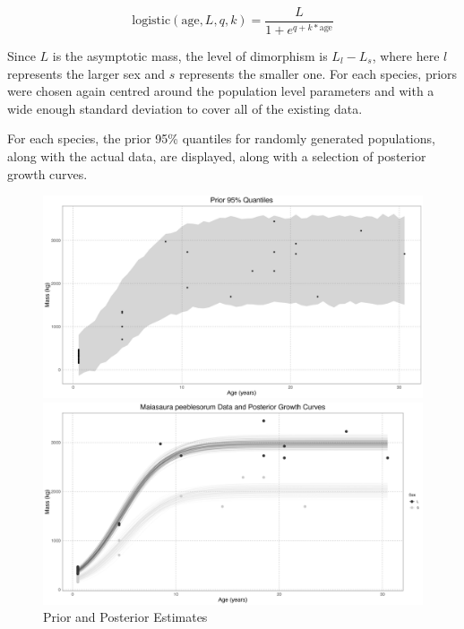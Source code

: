 \documentclass[letterpaper]{article}
\begin{document}
$$
\text{logistic}(\text{age}, L, q, k) = \frac{L}{1 + e^{q+k \ast \text{age}}}
$$

Since $L$ is the asymptotic mass, the level of dimorphism is $L_l - L_s$, where here $l$ represents the larger sex and $s$ represents the smaller one. For each species, priors were chosen again centred around the population level parameters and with a wide enough standard deviation to cover all of the existing data.

For each species, the prior 95\% quantiles for randomly generated populations, along with the actual data, are displayed, along with a selection of posterior growth curves.

\begin{figure}[H]
  \centering
  \begin{minipage}[b]{0.45\textwidth}
    \centering
    \includegraphics[width=\textwidth]{images/maiasauraPrior.png}
  \end{minipage}
  \begin{minipage}[b]{0.45\textwidth}
    \centering
    \includegraphics[width=\textwidth]{images/maiasauraPosterior.png}
  \end{minipage}
    \label{fig:maiasauraPriorPosterior}
    \caption{\maia{} Prior and Posterior Estimates}
\end{figure} 
\end{document}
